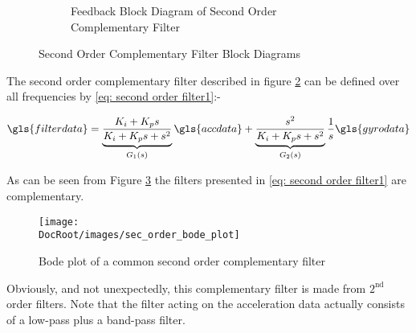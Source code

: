 \begin{figure}[h]
\begin{subfigure}[b]{0.32\textwidth}
{}
		\caption{Feedback Block Diagram of Second Order Complementary Filter}
		\label{fig:Feedback Block Diagram of Second Order Complementary Filter2}
	\end{subfigure}
	\caption{Second Order Complementary Filter Block Diagrams}
	\label{fig: second order comp filter}
\end{figure}


The second order complementary filter described in figure \ref{fig: second order comp filter} can be defined over all frequencies by \eqref{eq: second order filter1}:-


\begin{equation}
	\gls{filterdata}=\underbrace{ {\frac{K_i + K_p s}{K_i + K_p s + s^2}}}_{\text{$G_1(s)$}}\gls{accdata} + \underbrace{\frac{s^2}{K_i+K_p s + s^2}}_{\text{$G_2(s)$}}\frac{1}{s}\gls{gyrodata}
	\label{eq: second order filter1}
\end{equation}

As can be seen from Figure \ref{Fig:bode sec order com} the filters presented in \eqref{eq: second order filter1} are complementary.   


\begin{figure}[h]
	\centering
	\texttt{[image: \\DocRoot/images/sec\_order\_bode\_plot]}
	\caption{Bode plot of a common second order complementary filter}
	\label{Fig:bode sec order com}
\end{figure}

Obviously, and not unexpectedly, this complementary filter is made from $2^{\mathrm{nd}}$ order filters. Note that the filter acting on the acceleration data actually consists of a low-pass plus a band-pass filter.


